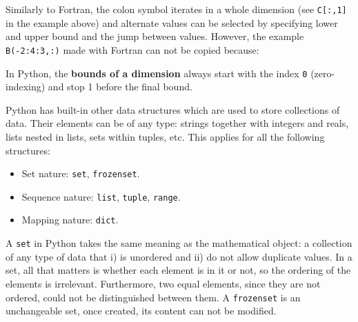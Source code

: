 Similarly to Fortran, the colon symbol iterates in a whole dimension (see \texttt{C[:,1]} in the example above) and 
alternate values can be selected by specifying lower and upper bound and the jump between values.
However, the example \texttt{B(-2:4:3,:)} made with Fortran can not be copied because:
\begin{IN}
In Python, the \textbf{bounds of a dimension} always start with the index \texttt{0} (zero-indexing) and
stop 1 before the final bound.  
\end{IN}









\vspace{0.5cm}
Python has built-in other data structures which are used to store collections of data.
Their elements can be of any type: strings together with integers and reals, lists nested in lists, sets within tuples, etc. 
This applies for all the following structures:
\vspace{-.5cm}
\begin{itemize}[noitemsep]    
    \item Set nature: \texttt{set}, \texttt{frozenset}.
    \item Sequence nature: \texttt{list}, \texttt{tuple}, \texttt{range}.
    \item Mapping nature: \texttt{dict}.
\end{itemize}
\vspace{-.5cm}

A \texttt{set} in Python takes the same meaning as the mathematical object: a collection of any type of data that 
i) is unordered and 
ii) do not allow duplicate values. 
In a set, all that matters is whether each element is in it or not, so the ordering of the elements is irrelevant.
Furthermore, two equal elements, since they are not ordered, could not be distinguished between them. 
A \texttt{frozenset} is an unchangeable set, once created, its content can not be modified. 



